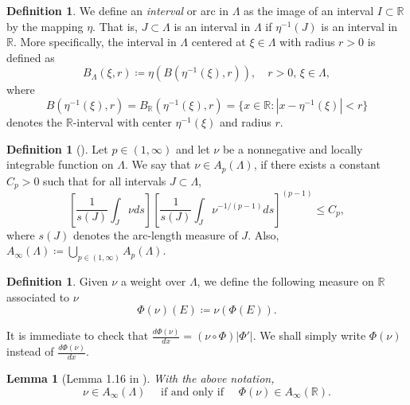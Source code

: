 \documentclass[12pt]{amsart}
\newcommand{\R}{\mathbb{R}}
\theoremstyle{plain}
\newtheorem{lemma}[theorem]{Lemma}
\theoremstyle{definition}
\newtheorem{definition}[theorem]{Definition}
\numberwithin{equation}{section}
\begin{document}
\begin{definition}\label{def:intervalLambda}
    We define an \textit{interval} or arc in $\Lambda$ as the image of an interval $I\subset \R$ by the mapping $\eta$. That is, $J\subset\Lambda$ is an interval in $\Lambda$ if $\eta^{-1}(J)$ is an interval in $\R$. More specifically, the interval in $\Lambda$ centered at $\xi\in\Lambda$ with radius $r>0$ is defined as
    \[
    B_{\Lambda}(\xi,r)
    \coloneqq 
    \eta(B(\eta^{-1}(\xi),r)),\quad r>0, \, \xi\in\Lambda,
    \]
    where
    \[
    B(\eta^{-1}(\xi),r)
    =
    B_{\R}(\eta^{-1}(\xi),r)
    =
    \{
    x\in \R: |x-\eta^{-1}(\xi)|<r
    \}
    \]
    denotes the $\R$-interval with center $\eta^{-1}(\xi)$ and radius $r$.
\end{definition}



\begin{definition}[\cite{kenigWeighted}]\label{def:definition1.4_Kenig}
Let $p\in (1,\infty)$ and let $\nu$ be a nonnegative and locally integrable function  on $\Lambda$. We say that $\nu\in A_p(\Lambda)$, if there exists a constant $C_p>0$ such that for all intervals $J \subset \Lambda$,
\begin{equation}\label{ApLambda}
\left[\frac{1}{s(J)} \int_J \nu d s\right]
\left[\frac{1}{s(J)} \int_J \nu^{-1 /(p-1)} d s\right]^{(p-1)} 
\leq
C_p,    
\end{equation}
where $s(J)$ denotes the arc-length measure of $J$. Also, $A_{\infty}(\Lambda)\coloneqq \bigcup_{p\in (1,\infty)}A_{p}(\Lambda)$.

\end{definition}

 
    
 





\begin{definition}\label{prop:funcionDensidadPhiNu}
Given $\nu$  a  weight over $\Lambda$, we define the following measure on $\R$ associated to $\nu$
\[
\Phi(\nu)(E)
\coloneqq 
\nu(\Phi(E)).
\]
\end{definition}
It is immediate to check that $\frac{d\Phi(\nu)}{dx}=\left(\nu \circ\Phi\right) |\Phi'|$. We shall simply write $\Phi(\nu)$ instead of $\frac{d\Phi(\nu)}{dx}$.


\begin{lemma}[Lemma 1.16 in \cite{kenigWeighted}]\label{phiNuAInfty}
With the above notation, 
\begin{equation}\label{AinftyEquivalence}
\nu\in A_{\infty}(\Lambda)\quad
\text{ if and only if }\quad
\Phi(\nu)\in A_{\infty}(\R).    
\end{equation}
\end{lemma}
\end{document}
